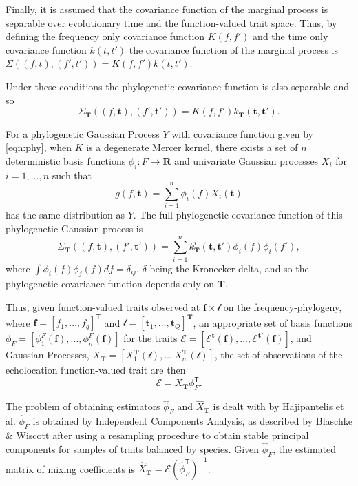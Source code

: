 \documentclass[wsdraft]{ws-rv9x6} %
\begin{document}
Finally, it is assumed that the covariance function of the marginal process is separable over evolutionary time and the function-valued trait space. Thus, by defining the frequency only covariance function \(K(f,f')\) and the time only covariance function \(k(t,t')\) the covariance function of the marginal process is \(\Sigma\left((f,t), (f',t')\right) = K(f, f') k(t,t')\).

Under these conditions the phylogenetic covariance function is also separable and so
\begin{equation}
\Sigma_{\mathbf{T}}\left((f,\mathbf{t}), (f',\mathbf{t}')\right) = K(f, f') k_{\mathbf{T}}(\mathbf{t},\mathbf{t}').
\label{eqn:phy}
\end{equation}

For a phylogenetic Gaussian Process \(Y\) with covariance function given by \ref{eqn:phy}, when \(K\) is a degenerate Mercer kernel, there exists a set of \(n\) deterministic basis functions \(\phi_i: F \to \mathbf{R}\) and univariate Gaussian processes \(X_i\) for \(i = 1,\dots, n\) such that 
\[
g(f, \mathbf{t}) = \sum_{i = 1}^{n} \phi_i(f) X_i(\mathbf{t})
\] 
has the same distribution as \(Y\). The full phylogenetic covariance function of this phylogenetic Gaussian process is
\[
\Sigma_{\mathbf{T}}((f, \mathbf{t}), (f', \mathbf{t}')) = \sum_{i = 1}^{n}  k_{\mathbf{T}}^i(\mathbf{t}, \mathbf{t}') \phi_i(f) \phi_i(f'),
\]
where \(\int \phi_i(f) \phi_j(f) df = \delta_{ij}\), \(\delta\) being the Kronecker delta, and so the phylogenetic covariance function depends only on \(\mathbf{T}\). 

Thus, given function-valued traits observed at \(\mathbf{f} \times \mathcal{t}\) on the frequency-phylogeny, where \(\mathbf{f} = [f_1, \dots, f_q]^{\mathsf{T}}\) and \(\mathcal{t} = [\mathbf{t}_1, \dots, \mathbf{t}_Q]^{\mathbf{T}}\), an appropriate set of basis functions \(\phi_{F} = [\phi^{F}_1(\mathbf{f}), \dots, \phi^{F}_n(\mathbf{f})]\) for the traits \(\mathcal{E} = [\mathcal{E}^{\mathbf{t}}(\mathbf{f}), \dots, \mathcal{E}^{\mathbf{t}'}(\mathbf{f})]\), and Gaussian Processes, \(X_{\mathbf{T}} = [X_1^{\mathbf{T}}(\mathcal{t}), \dots\ X_n^{\mathbf{T}}(\mathcal{t})]\), the set of observations of the echolocation function-valued trait are then 
\begin{equation}
\mathcal{E} = X_{\mathbf{T}} \phi_F^{\mathsf{T}}.
\label{eqn:inv}
\end{equation}

The problem of obtaining estimators \(\hat{\phi}_F\) and \(\hat{X}_{\mathbf{T}}\) is dealt with by Hajipantelis et al. \cite{hadjipantelis2013function} \(\hat{\phi}_F\) is obtained by Independent Components Analysis, as described by Blaschke \& Wiscott\cite{blaschke2004cubica} after using a resampling procedure to obtain stable principal components for samples of traits balanced by species. Given \(\hat{\phi}_F\), the estimated matrix of mixing coefficients is \(\hat{X}_{\mathbf{T}} = \mathcal{E} (\hat{\phi}_F^{\mathsf{T}})^{-1}\). 
\end{document}
